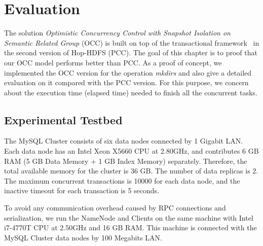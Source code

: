 
%
%


\chapter{Evaluation}
\label{ch:evaluation}

The solution \textit{Optimistic Concurrency Control with Snapshot Isolation on Semantic Related Group} (OCC) is built on top of the transactional framework~\cite{peiro2013maintaining} in the second version of Hop-HDFS (PCC). The goal of this chapter is to proof that our OCC model performs better than PCC. As a proof of concept, we implemented the OCC version for the operation \textit{mkdirs} and also give a detailed evaluation on it compared with the PCC version. For this purpose, we concern about the execution time (elapsed time) needed to finish all the concurrent tasks.

\section{Experimental Testbed}
\label{sec:testbed}

The MySQL Cluster consists of six data nodes connected by 1 Gigabit LAN. Each data node has an Intel Xeon X5660 CPU at 2.80GHz, and contributes 6 GB RAM (5 GB Data Memory + 1 GB Index Memory) separately. Therefore, the total available memory for the cluster is 36 GB. The number of data replicas is 2. The maximum concurrent transactions is 10000 for each data node, and the inactive timeout for each transaction is 5 seconds. 

\noindent To avoid any communication overhead caused by RPC connections and serialization, we run the NameNode and Clients on the same machine with Intel i7-4770T CPU at 2.50GHz and 16 GB RAM. This machine is connected with the MySQL Cluster data nodes by 100 Megabits LAN.



